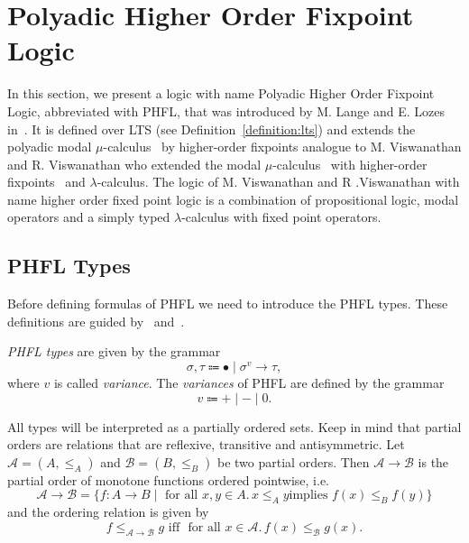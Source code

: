 
\section{Polyadic Higher Order Fixpoint Logic}\label{sec:polyadichigherorderfixpointlogic}

In this section, we present a logic with name Polyadic Higher Order Fixpoint Logic, abbreviated with PHFL, that was
introduced by M. Lange and E. Lozes in~\cite{lange2014capturing}. It is defined over LTS (see
Definition~\ref{definition:lts}) and extends the polyadic modal $\mu$-calculus~\cite{otto1999bisimulation} by
higher-order fixpoints analogue to M. Viswanathan and R. Viswanathan who extended the modal
$\mu$-calculus~\cite{kozen1983results} with higher-order fixpoints~\cite{viswanathan2004higher} and $\lambda$-calculus. The logic of M. Viswanathan and R
.Viswanathan with name higher order fixed point logic is a combination of propositional logic, modal operators and
a simply typed $\lambda$-calculus with fixed point operators. 

\subsection{PHFL Types}\label{subsec:phflTypes}

Before defining formulas of PHFL we need to introduce the PHFL types. These definitions are guided
by~\cite{viswanathan2004higher} and~\cite{lange2014capturing}.

\begin{definition}
    \emph{PHFL types} are given by the grammar
    \[\sigma, \tau \Coloneqq \bullet \mid \sigma^v \rightarrow \tau,\]
    where $v$ is called \textit{variance}. The \emph{variances} of PHFL are defined by the grammar
    \[v \Coloneqq + \mid - \mid 0.\]
\end{definition}

All types will be interpreted as a partially ordered sets. Keep in mind that partial orders are relations that are reflexive, transitive
and antisymmetric. Let $\mathcal{A} = (A, \leq_A)$ and $\mathcal{B} = (B, \leq_B)$ be two partial orders. Then
$\mathcal{A} \rightarrow \mathcal{B}$ is the partial order of monotone functions ordered pointwise, i.e.
\[\mathcal{A} \rightarrow \mathcal{B} = \{f\colon A\rightarrow B \mid \text{ for all } x,y \in A.\,x\leq_A y \text{
implies }
f(x)
\leq_B f(y)\}\]
and the ordering relation is given by
\[f \leq_{\mathcal{A}\rightarrow\mathcal{B}} g\text{ iff } \text{ for all } x\in \mathcal{A}.\,f(x) \leq_{\mathcal{B}} g
(x).\]

